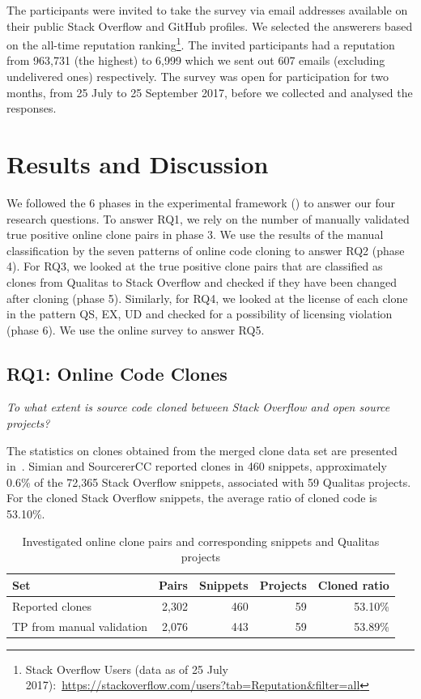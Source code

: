 \documentclass[10pt,journal,compsoc]{IEEEtran}
\begin{document}
The participants were invited to take the survey via email addresses available
on their public Stack Overflow and GitHub profiles. We selected the answerers
based on the all-time reputation ranking\footnote{Stack Overflow Users (data as
of 25 July 2017):~\url{https://stackoverflow.com/users?tab=Reputation&filter=all}}. The
invited participants had a reputation from 963,731 (the highest) to 6,999 which
we sent out 607 emails (excluding undelivered ones) respectively. The survey was
open for participation for two months, from 25 July to 25 September 2017, before
we collected and analysed the responses.

\section{Results and Discussion}

We followed the 6 phases in the experimental framework
() to answer our four research questions. To answer RQ1,
we rely on the number of manually validated true positive online clone pairs in
phase 3. We use the results of the manual classification by the seven patterns
of online code cloning to answer RQ2 (phase 4). For RQ3, we looked at the true
positive clone pairs that are classified as clones from Qualitas to Stack
Overflow and checked if they have been changed after cloning (phase 5).
Similarly, for RQ4, we looked at the license of each clone in the pattern QS,
EX, UD and checked for a possibility of licensing violation (phase 6). We use
the online survey to answer RQ5.

\subsection{RQ1: Online Code Clones} 
\vspace{0.25cm}
\textit{To what extent is source
	code cloned between Stack Overflow and open source projects?}
\vspace{0.25cm}

The statistics on clones obtained from the merged clone data set are
presented in~. Simian and SourcererCC
reported clones in 460 snippets, approximately 0.6\% of the
72,365 Stack Overflow snippets, associated with 59 Qualitas
projects. For the cloned Stack Overflow snippets, the
average ratio of cloned code is 53.10\%.

\begin{table}
	\caption{Investigated online clone pairs and corresponding snippets
		and Qualitas projects}
	\label{tab:snippets}
	\centering
	\begin{tabular}{p{2.2cm}rrrr}
		\toprule
		Set & Pairs & Snippets & Projects & Cloned ratio \\
		\midrule
		Reported clones & 2,302 & 460 & 59 & 53.10\% \\ 
		\midrule
		TP from manual validation & 2,076 & 443 & 59 & 53.89\% \\ 
		\bottomrule
	\end{tabular}
\end{table}
\end{document}
